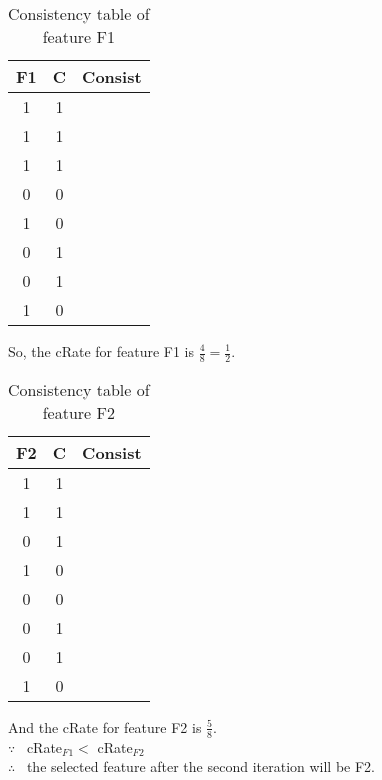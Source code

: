 \documentclass{article}
\newcommand{\tickYes}{\checkmark}
\newcommand{\tickNo}{\hspace{1pt}\ding{55}}
\begin{document}
\begin{enumerate}
\begin{table}[ht]
  \begin{center}
    \begin{tabular}{| c || c | c |}
      \hline F1 & C & Consist \\
      \hline 1 & 1 & \tickYes \\
      \hline 1 & 1 & \tickYes \\
      \hline 1 & 1 & \tickYes \\
      \hline 0 & 0 & \tickYes \\
      \hline 1 & 0 & \tickNo  \\
      \hline 0 & 1 & \tickNo  \\
      \hline 0 & 1 & \tickNo  \\
      \hline 1 & 0 & \tickNo  \\
      \hline 
    \end{tabular}
    \caption{Consistency table of feature F1}
  \end{center}
\end{table}
So, the cRate for feature F1 is $\frac{4}{8} = \frac{1}{2}$. 

\begin{table}[ht]
  \begin{center}
    \begin{tabular}{| c || c | c |}
      \hline F2 & C & Consist \\
      \hline 1 & 1 & \tickNo  \\
      \hline 1 & 1 & \tickNo  \\
      \hline 0 & 1 & \tickYes \\
      \hline 1 & 0 & \tickYes \\
      \hline 0 & 0 & \tickNo  \\
      \hline 0 & 1 & \tickYes \\
      \hline 0 & 1 & \tickYes \\
      \hline 1 & 0 & \tickYes \\
      \hline 
    \end{tabular}
    \caption{Consistency table of feature F2}
  \end{center}
\end{table}
And the cRate for feature F2 is $\frac{5}{8}$. \\ 

$\because$~ cRate$_{F1} < $ cRate$_{F2}$ \\
$\therefore$~ the selected feature after the second iteration will be F2. 
\end{enumerate}
\end{document}
